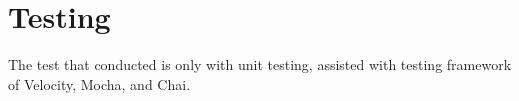 \section{Testing}
\label{sec:testing}

The test that conducted is only with unit testing, assisted with testing framework of Velocity, Mocha, and Chai.

